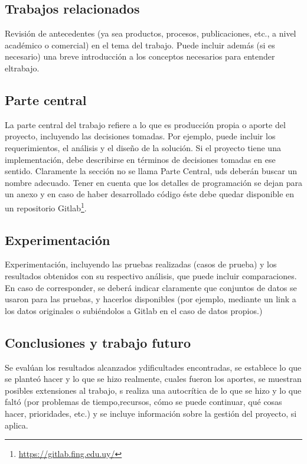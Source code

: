 \documentclass[conference]{IEEEtran}
\begin{document}
\subsection{Trabajos relacionados}
\label{relacionados}
Revisión de antecedentes (ya sea productos, procesos, publicaciones, etc., a nivel académico   o   comercial)   en   el   tema   del   trabajo.   Puede   incluir   además   (si   es necesario)   una   breve   introducción   a   los   conceptos   necesarios   para   entender   eltrabajo.

\subsection{Parte central}
\label{desarrollo}
La  parte central  del   trabajo   refiere   a   lo   que   es   producción   propia   o   aporte   del proyecto, incluyendo las decisiones tomadas. Por ejemplo, puede incluir los requerimientos, el análisis y el diseño de la solución. Si el proyecto tiene una implementación, debe describirse en términos de decisiones tomadas en ese sentido. Claramente la sección no se llama Parte Central, uds deberán buscar un nombre adecuado. Tener en cuenta que los detalles de programación se dejan para un anexo y en caso de haber desarrollado código éste debe quedar disponible en un repositorio Gitlab\footnote{\url{https://gitlab.fing.edu.uy/}}.

\subsection{Experimentación}
\label{expe}
Experimentación, incluyendo   las   pruebas   realizadas   (casos   de   prueba)   y   los resultados obtenidos con su respectivo análisis, que puede incluir comparaciones. En caso de corresponder, se deberá indicar claramente que conjuntos de datos se usaron para las pruebas, y hacerlos disponibles (por ejemplo, mediante un link a los datos originales o subiéndolos a Gitlab en el caso de datos propios.)

\subsection{Conclusiones y trabajo futuro}
\label{conclusion}
Se   evalúan   los   resultados   alcanzados    ydificultades   encontradas,   se   establece   lo   que   se   planteó   hacer   y   lo   que   se   hizo realmente, cuales fueron los aportes, se  muestran posibles extensiones al trabajo, s realiza una autocrítica de lo que se hizo y lo que faltó (por problemas de tiempo,recursos, cómo se puede continuar, qué cosas hacer, prioridades, etc.) y se incluye información sobre la gestión del proyecto, si aplica.




%


\end{document}

